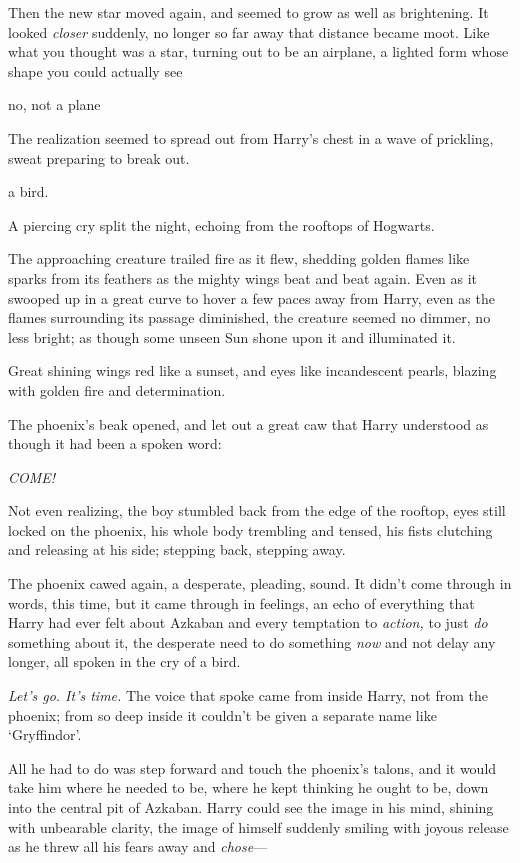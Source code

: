 Then the new star moved again, and seemed to grow as well as brightening. It
looked \emph{closer} suddenly, no longer so far away that distance became moot.
Like what you thought was a star, turning out to be an airplane, a lighted form
whose shape you could actually see{\el}

{\el} no, not a plane{\el}

The realization seemed to spread out from Harry's chest in a wave of prickling,
sweat preparing to break out.

{\el} a bird.

A piercing cry split the night, echoing from the rooftops of Hogwarts.

The approaching creature trailed fire as it flew, shedding golden flames like
sparks from its feathers as the mighty wings beat and beat again. Even as it
swooped up in a great curve to hover a few paces away from Harry, even as the
flames surrounding its passage diminished, the creature seemed no dimmer, no
less bright; as though some unseen Sun shone upon it and illuminated it.

Great shining wings red like a sunset, and eyes like incandescent pearls,
blazing with golden fire and determination.

The phoenix's beak opened, and let out a great caw that Harry understood as
though it had been a spoken word:

\emph{COME!}

Not even realizing, the boy stumbled back from the edge of the rooftop, eyes
still locked on the phoenix, his whole body trembling and tensed, his fists
clutching and releasing at his side; stepping back, stepping away.

The phoenix cawed again, a desperate, pleading, sound. It didn't come through
in words, this time, but it came through in feelings, an echo of everything
that Harry had ever felt about Azkaban and every temptation to \emph{action,}
to just \emph{do} something about it, the desperate need to do something
\emph{now} and not delay any longer, all spoken in the cry of a bird.

\emph{Let's go. It's time.} The voice that spoke came from inside Harry, not
from the phoenix; from so deep inside it couldn't be given a separate name like
`Gryffindor'.

All he had to do was step forward and touch the phoenix's talons, and it would
take him where he needed to be, where he kept thinking he ought to be, down
into the central pit of Azkaban. Harry could see the image in his mind, shining
with unbearable clarity, the image of himself suddenly smiling with joyous
release as he threw all his fears away and \emph{chose}—

